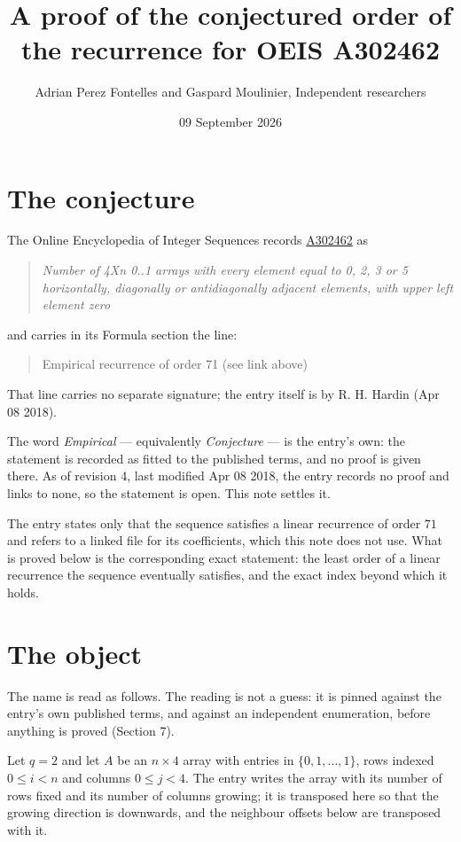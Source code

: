 \documentclass[11pt]{article}
\title{A proof of the conjectured order of the recurrence for OEIS A302462}
\author{Adrian Perez Fontelles and Gaspard Moulinier, Independent researchers}
\date{09 September 2026}
\theoremstyle{definition}
\begin{document}
\maketitle
\section{The conjecture}

The Online Encyclopedia of Integer Sequences records \href{https://oeis.org/A302462}{A302462} as

\begin{quote}\itshape Number of 4Xn 0..1 arrays with every element equal to 0, 2, 3 or 5 horizontally, diagonally or antidiagonally adjacent elements, with upper left element zero\end{quote}

and carries in its Formula section the line:

\begin{quote}\ttfamily Empirical recurrence of order 71 (see link above)\end{quote}

That line carries no separate signature; the entry itself is by R. H. Hardin (Apr 08 2018).

The word {\itshape Empirical} --- equivalently {\itshape Conjecture} --- is the entry's own: the statement is recorded as fitted to the published terms, and no proof is given there. As of revision 4, last modified Apr 08 2018, the entry records no proof and links to none, so the statement is open. This note settles it.

The entry states only that the sequence satisfies a linear recurrence of order $71$ and refers to a linked file for its coefficients, which this note does not use. What is proved below is the corresponding exact statement: the least order of a linear recurrence the sequence eventually satisfies, and the exact index beyond which it holds.

\section{The object}

The name is read as follows. The reading is not a guess: it is pinned against the entry's own published terms, and against an independent enumeration, before anything is proved (Section 7).

Let $q = 2$ and let $A$ be an $n \times 4$ array with entries in $\{0,1,\dots,1\}$, rows indexed $0 \le i < n$ and columns $0 \le j < 4$. The entry writes the array with its number of rows fixed and its number of columns growing; it is transposed here so that the growing direction is downwards, and the neighbour offsets below are transposed with it.
\end{document}
